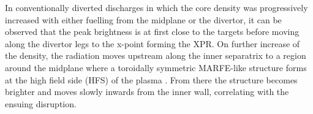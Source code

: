 
In conventionally diverted discharges\cite{Morris2018} in which the core density was progressively increased with either fuelling from the midplane or the divertor, it can be observed that the peak brightness is at first close to the targets before moving along the divertor legs to the x-point forming the XPR. On further increase of the density, the radiation moves upstream along the inner separatrix to a region around the midplane where a toroidally symmetric MARFE-like structure forms at the high field side (HFS) of the plasma \cite{Lipschultz1984}. From there the structure becomes brighter and moves slowly inwards from the inner wall, correlating with the ensuing disruption.

